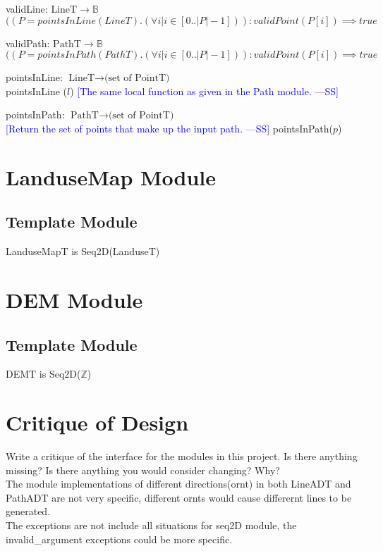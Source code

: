 \documentclass[12pt]{article}
\newcommand{\authornote}[3]{\textcolor{#1}{[#3 ---#2]}}
\newcommand{\authornote}[3]{}
\newcommand{\wss}[1]{\authornote{blue}{SS}{#1}}
\begin{document}
\noindent validLine: $\mbox{LineT} \rightarrow \mathbb{B}$\\
\noindent $((P = pointsInLine(LineT). (\forall i|i\in [0..|P|-1])) : validPoint(P[i]) \implies true$

\noindent validPath: $\mbox{PathT} \rightarrow \mathbb{B}$\\
\noindent $((P = pointsInPath(PathT). (\forall i|i\in [0..|P|-1])) : validPoint(P[i]) \implies true$

\noindent pointsInLine: $\mbox{LineT} \rightarrow \mbox{(set of PointT)}$\\
\noindent pointsInLine ($l$) 
\wss{The same local function as given in the Path module.}

\noindent pointsInPath: $\mbox{PathT} \rightarrow \mbox{(set of PointT)}$\\
\wss{Return the set of points that make up the input path.}
\noindent pointsInPath($p$) 

\newpage

\section* {LanduseMap Module}

\subsection* {Template Module}

LanduseMapT is Seq2D(LanduseT)

\section* {DEM Module}

\subsection* {Template Module}

DEMT is Seq2D($\mathbb{Z}$)

\newpage

\section*{Critique of Design}

Write a critique of the interface for the modules in this project.  Is there
anything missing?  Is there anything you would consider changing?  Why?\\

The module implementations of different directions(ornt) in both LineADT and PathADT are not very specific, different ornts would cause differernt
lines to be generated.\\
The exceptions are not include all situations for seq2D module, the invalid\_argument exceptions could be more specific. 
\end{document}

